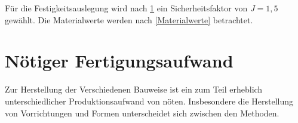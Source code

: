 Für die Festigkeitsauslegung wird nach \ref{} ein Sicherheitsfaktor von $ J = 1,5 $ gewählt. Die Materialwerte werden nach \ref{Materialwerte} betrachtet.

\section{Nötiger Fertigungsaufwand}

Zur Herstellung der Verschiedenen Bauweise ist ein zum Teil erheblich unterschiedlicher Produktionsaufwand von nöten. Insbesondere die Herstellung von Vorrichtungen und Formen unterscheidet sich zwischen den Methoden. 